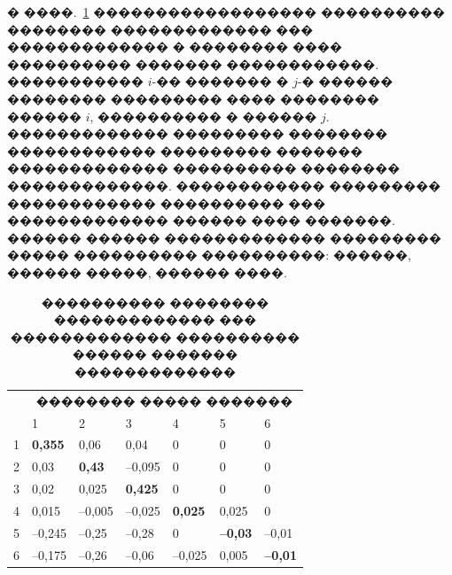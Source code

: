 \documentclass[12pt,twoside, notitlepage]{article}
\begin{document}
� ����.~\ref{improvement} ������������������ ���������� �������� ������������� ��� ������������� � �������� ���� ���������� ������� ������������.
����������� $i$-�� ������� � $j$-� ������ �������� ��������� ���� �������� ������ $i$, ���������� � ������ $j$. ������������� ��������� �������� ������������ ��������� ������� ������������� ���������� �������� �������������. ������������ ��������� ������������ ���������� ��� ������������� ������ ���� �������.
������ ������ ������������� ��������� ����� ���������� ����������: ������, ������ �����, ������ ����.

\begin{table}[!h]
\centering
\caption{���������� �������� ������������� ��� ������������� ���������� ������ ������� �������������}
\label{improvement}
\begin{tabular}{|l|l|l|l|l|l|l|}
\hline
\multirow{2}{*}{} & \multicolumn{6}{c|}{�������� ����� �������}       \\ \cline{2-7}
    & 1      & 2      & 3      & 4      & 5     & 6     \\ \hline
1   & \textbf{0,355}  & 0,06   & 0,04   & 0      & 0     & 0     \\ \hline
2   & 0,03   & \textbf{0,43}   & --0,095 & 0      & 0     & 0     \\ \hline
3   & 0,02   & 0,025  & \textbf{0,425}  & 0      & 0     & 0     \\ \hline
4   & 0,015  & --0,005 & --0,025 & \textbf{0,025}  & 0,025 & 0     \\ \hline
5   & --0,245 & --0,25  & --0,28  & 0      & \textbf{--0,03} & --0,01 \\ \hline
6   & --0,175 & --0,26  & --0,06  & --0,025 & 0,005 & \textbf{--0,01} \\ \hline
\end{tabular}
\end{table}
\end{document}
